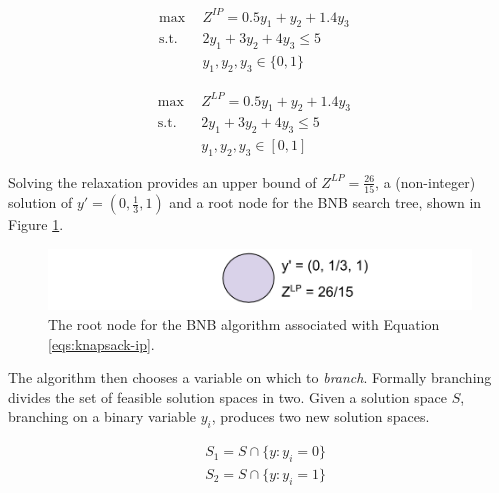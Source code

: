 \begin{subequations}\label{eqs:knapsack-ip}
  \begin{align}
    \max \:\: & 
    Z^{IP} = 0.5 y_1 + y_2 + 1.4 y_3
    & \\
    \text{s.t.} \:\: &
    2y_1 + 3y_2 + 4y_3 \leq 5 
    & \\
    &
    y_1, y_2, y_3 \in \{ 0, 1 \}
  \end{align}
\end{subequations}

\begin{subequations}\label{eqs:knapsack-lp}
  \begin{align}
    \max \:\: & 
    Z^{LP} = 0.5 y_1 + y_2 + 1.4 y_3
    & \\
    \text{s.t.} \:\: &
    2y_1 + 3y_2 + 4y_3 \leq 5 
    & \\
    &
    y_1, y_2, y_3 \in [0, 1]
  \end{align}
\end{subequations}

Solving the relaxation provides an upper bound of $Z^{LP} = \frac{26}{15}$, a
(non-integer) solution of $y' = (0, \frac{1}{3}, 1)$ and a root node for the BNB
search tree, shown in Figure \ref{fig:root}.

\begin{figure}[H]
  \begin{center}
    \includegraphics[width=0.8\linewidth]{./backmatter/figs/root.png}
  \caption{The root node for the BNB algorithm associated with 
  Equation \ref{eqs:knapsack-ip}.}
  \label{fig:root}
  \end{center}
\end{figure}

The algorithm then chooses a variable on which to \textit{branch}. Formally
branching divides the set of feasible solution spaces in two. Given a solution
space $S$, branching on a binary variable $y_i$, produces two new solution
spaces.

\begin{equation}
\begin{split}
& S_1 = S \cap \{y: y_i = 0\}
\\
& S_2 = S \cap \{y: y_i = 1\}
\end{split}
\end{equation}

